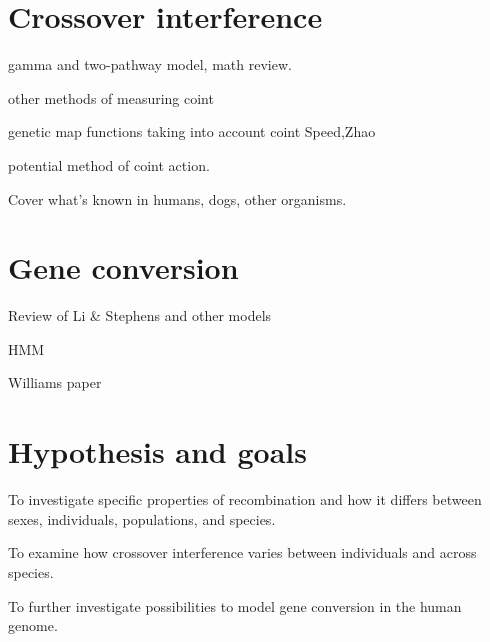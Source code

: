 \section{Crossover interference}

\begin{titemize}
    \item gamma and two-pathway model, math review.
    \item other methods of measuring coint
    \item genetic map functions taking into account coint Speed,Zhao
    \item potential method of coint action.
    \item Cover what's known in humans, dogs, other organisms.
\end{titemize}

\section{Gene conversion}

\begin{titemize}
    \item Review of Li \& Stephens and other models
    \item HMM
    \item Williams paper
\end{titemize}

\section{Hypothesis and goals}

\begin{titemize}
    \item To investigate specific properties of recombination and how it differs between sexes, individuals, populations, and species.
    \item To examine how crossover interference varies between individuals and across species.
    \item To further investigate possibilities to model gene conversion in the human genome.
\end{titemize}

